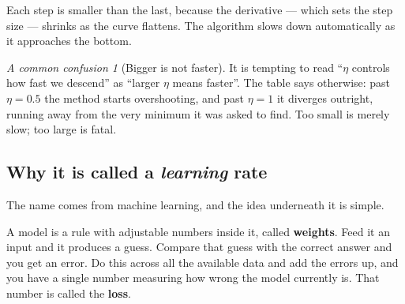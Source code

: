 \documentclass[11pt]{article}
\theoremstyle{plain}
\theoremstyle{definition}
\theoremstyle{remark}
\newtheorem*{warn}{A common confusion}
\newcommand{\lr}{\eta}
\begin{document}
\begin{center}
\end{center}

\noindent Each step is smaller than the last, because the derivative --- which
sets the step size --- shrinks as the curve flattens. The algorithm slows down
automatically as it approaches the bottom.

\begin{warn}[Bigger is not faster]
It is tempting to read ``$\lr$ controls how fast we descend'' as ``larger $\lr$
means faster''. The table says otherwise: past $\lr=0.5$ the method starts
overshooting, and past $\lr=1$ it diverges outright, running away from the very
minimum it was asked to find. Too small is merely slow; too large is fatal.
\end{warn}

\subsection{Why it is called a \emph{learning} rate}
The name comes from machine learning, and the idea underneath it is simple.

A model is a rule with adjustable numbers inside it, called \textbf{weights}.
Feed it an input and it produces a guess. Compare that guess with the correct
answer and you get an error. Do this across all the available data and add the
errors up, and you have a single number measuring how wrong the model currently
is. That number is called the \textbf{loss}.
\end{document}
